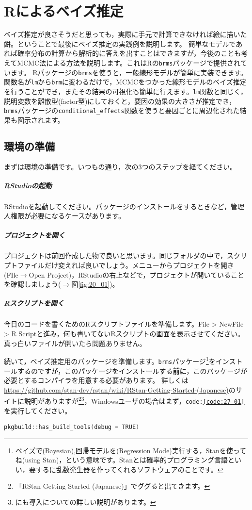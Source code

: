 \documentclass{ltjsarticle}
\begin{document}
\chapter{Rによるベイズ推定}
\label{chapter27}
ベイズ推定が良さそうだと思っても，実際に手元で計算できなければ絵に描いた餅。ということで最後にベイズ推定の実践例を説明します。
簡単なモデルであれば確率分布の計算から解析的に答えを出すことはできますが，今後のことも考えてMCMC法による方法を説明します。これはRの\texttt{brms}パッケージ\parencite{brmsCite1,brmsCite2}で提供されています。
Rパッケージの\texttt{brms}を使うと，一般線形モデルが簡単に実装できます。関数名が\texttt{lm}から\texttt{brm}に変わるだけで，MCMCをつかった線形モデルのベイズ推定を行うことができ，またその結果の可視化も簡単に行えます。\texttt{lm}関数と同じく，説明変数を離散型(factor型)にしておくと，要因の効果の大きさが推定でき，\texttt{brms}パッケージの\verb|conditional_effects|関数を使うと要因ごとに周辺化された結果も図示されます。
\section{環境の準備}
まずは環境の準備です。いつもの通り，次の3つのステップを経てください。
\paragraph{RStudioの起動}RStudioを起動してください。パッケージのインストールをするときなど，管理人権限が必要になるケースがあります。
\paragraph{プロジェクトを開く}プロジェクトは前回作成した物で良いと思います。同じフォルダの中で，スクリプトファイルだけ変えれば良いでしょう。メニューからプロジェクトを開き(FIle$\to$Open Project)，RStudioの右上などで，プロジェクトが開いていることを確認しましょう($\to$図\ref{fig:20_01})。
\paragraph{Rスクリプトを開く}今日のコードを書くためのRスクリプトファイルを準備します。File > NewFile > R Scriptと進み，何も書いてないRスクリプトの画面を表示させてください。真っ白いファイルが開いたら問題ありません。

続いて，ベイズ推定用のパッケージを準備します。\texttt{brms}パッケージ\footnote{ベイズで(Bayesian),回帰モデルを(Regression Mode)実行する，Stanを使ってね(using Stan)，という意味です。Stanとは確率的プログラミング言語といい，要するに乱数発生器を作ってくれるソフトウェアのことです。}をインストールするのですが，このパッケージをインストールする\textbf{前に}，このパッケージが必要とするコンパイラを用意する必要があります。
詳しくは \url{https://github.com/stan-dev/rstan/wiki/RStan-Getting-Started-(Japanese)}のサイトに説明がありますが\footnote{「RStan Getting Started (Japanese)」でググると出てきます。}\footnote{\textcite{Baba201907}にも導入についての詳しい説明があります。}，Windowsユーザの場合はまず，\texttt{code:\ref{code:27_01}}を実行してください。
\begin{lstlisting}[language=c++,label={code:27_01},caption={必要なツールをインストールする}]
pkgbuild::has_build_tools(debug = TRUE)
\end{lstlisting}
\end{document}
